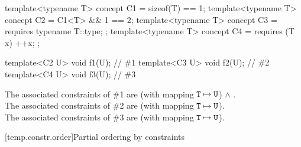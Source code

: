 \pnum
\begin{example}
\begin{codeblock}
template<typename T> concept C1 = sizeof(T) == 1;
template<typename T> concept C2 = C1<T> && 1 == 2;
template<typename T> concept C3 = requires { typename T::type; };
template<typename T> concept C4 = requires (T x) { ++x; };

template<C2 U> void f1(U);      // \#1
template<C3 U> void f2(U);      // \#2
template<C4 U> void f3(U);      // \#3
\end{codeblock}
The associated constraints of \#1 are
 (with mapping $\texttt{\protect T} \mapsto \texttt{\protect U}$) $\land$ .\\
The associated constraints of \#2 are
 (with mapping $\texttt{\protect T} \mapsto \texttt{\protect U}$).\\
The associated constraints of \#3 are
 (with mapping $\texttt{\protect T} \mapsto \texttt{\protect U}$).
\end{example}

[temp.constr.order]{Partial ordering by constraints}

